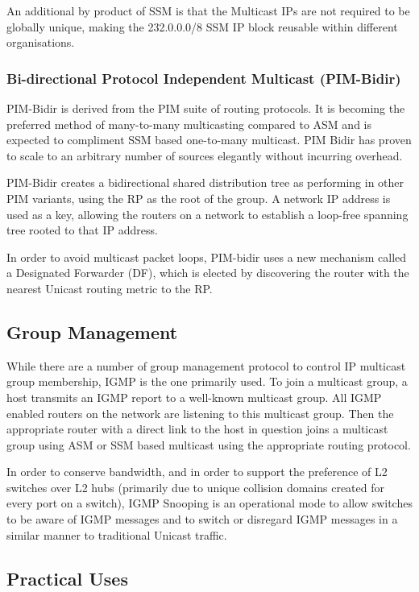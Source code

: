 An additional by product of SSM is that the Multicast IPs are not 
required to be globally unique, making the 232.0.0.0/8 SSM IP block
reusable within different organisations.

\subsubsection{Bi-directional Protocol Independent Multicast (PIM-Bidir)}
\label{sec:pim-bidir}

PIM-Bidir is derived from the PIM suite of routing protocols. It is
becoming the preferred method of many-to-many multicasting compared to
ASM and is expected to compliment SSM based one-to-many multicast. PIM
Bidir has proven to scale to an arbitrary number of sources elegantly
without incurring overhead. 


PIM-Bidir creates a bidirectional shared distribution tree as
performing in other PIM variants, using the RP as the root of the group.
A network IP address is used as a key, allowing the routers on a network
to establish a loop-free spanning tree rooted to that IP address.


In order to avoid multicast packet loops, PIM-bidir uses a new mechanism
called a Designated Forwarder (DF), which is elected by discovering the
router with the nearest Unicast routing metric to the RP.

\subsection{Group Management}

While there are a number of group management protocol to control IP
multicast group membership, IGMP is the one primarily used. To join a
multicast group, a host transmits an IGMP report to a well-known
multicast group. All IGMP enabled routers on the network are listening to
this multicast group. Then the appropriate router with a direct link to
the host in question joins a multicast group using ASM or SSM based
multicast using the appropriate routing protocol.


In order to conserve bandwidth, and in order to support the preference
of L2 switches over L2 hubs (primarily due to unique collision domains
created for every port on a switch), IGMP Snooping is an operational
mode to allow switches to be aware of IGMP messages and to switch or
disregard IGMP messages in a similar manner to traditional Unicast
traffic.

\subsection{Practical Uses}

